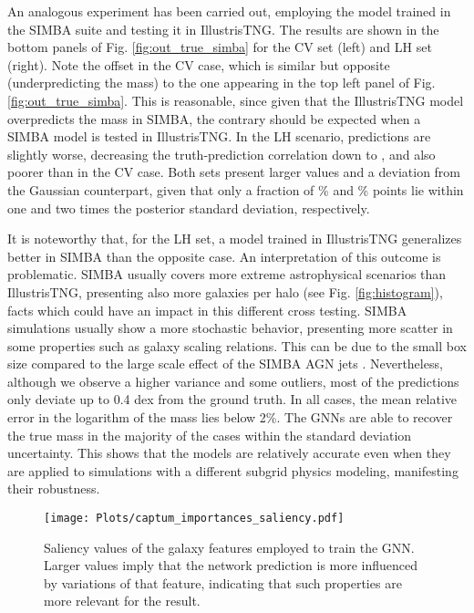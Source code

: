 \documentclass[twocolumn]{aastex631}
\begin{document}
An analogous experiment has been carried out, employing the model trained in the SIMBA suite and testing it in IllustrisTNG. The results are shown in the bottom panels of Fig. \ref{fig:out_true_simba} for the CV set (left) and LH set (right). Note the offset in the CV case, which is similar but opposite (underpredicting the mass) to the one appearing in the top left panel of Fig. \ref{fig:out_true_simba}. This is reasonable, since given that the IllustrisTNG model overpredicts the mass in SIMBA, the contrary should be expected when a SIMBA model is tested in IllustrisTNG. In the LH scenario, predictions are slightly worse, decreasing the truth-prediction correlation down to , and also poorer than in the CV case. Both sets present larger  values and a deviation from the Gaussian counterpart, given that only a fraction of \% and  \% points lie within one and two times the posterior standard deviation, respectively.

It is noteworthy that, for the LH set, a model trained in IllustrisTNG generalizes better in SIMBA than the opposite case. An interpretation of this outcome is problematic. SIMBA usually covers more extreme astrophysical scenarios than IllustrisTNG, presenting also more galaxies per halo (see Fig. \ref{fig:histogram}), facts which could have an impact in this different cross testing. SIMBA simulations usually show a more stochastic behavior, presenting more scatter in some properties such as galaxy scaling relations. This can be due to the small box size compared to the large scale effect of the SIMBA AGN jets \citep{Dave:2019yyq, villaescusanavarro2020camels}. Nevertheless, although we observe a higher variance and some outliers, most of the predictions only deviate up to 0.4 dex from the ground truth. In all cases, the mean relative error in the logarithm of the mass lies below 2\%. The GNNs are able to recover the true mass in the majority of the cases within the standard deviation uncertainty. This shows that the models are relatively accurate even when they are applied to simulations with a different subgrid physics modeling, manifesting their robustness.


\begin{figure}[t!]
\begin{center}
\texttt{[image: Plots/captum\_importances\_saliency.pdf]}
\caption{Saliency values of the galaxy features employed to train the GNN. Larger values imply that the network prediction
is more influenced by variations of that feature, indicating that such properties are more relevant for the result.}
\label{fig:captum}
\end{center}
\end{figure}
\end{document}
